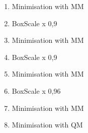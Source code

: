 \documentclass[a4paper,fleqn]{report}
\begin{document}
	\begin{enumerate}
		\setlength{\itemsep}{-1pt}
		\setlength{\parsep}{-1pt}
		\item Minimisation with MM
		\item BoxScale x 0,9
		\item Minimisation with MM
		\item BoxScale x 0,9
		\item Minimisation with MM
		\item BoxScale x 0,96
		\item Minimisation with MM
		\item Minimisation with QM
	\end{enumerate}

	\newpage
	\begin{spacing}{0.75}
		\label{Referenties}
		\clearpage
		\renewcommand{\bibname}{Referenties}
		
	\end{spacing}
	
	
\end{document}
